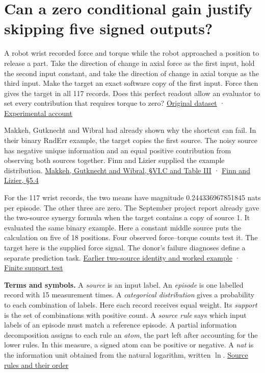 \section{Can a zero conditional gain justify skipping five signed outputs?}\label{can-a-zero-conditional-gain-justify-skipping-five-signed-outputs}

A robot wrist recorded force and torque while the robot approached a position to release a part. Take the direction of change in axial force as the first input, hold the second input constant, and take the direction of change in axial torque as the third input. Make the target an exact software copy of the first input. Force then gives the target in all 117 records. Does this perfect readout allow an evaluator to set every contribution that requires torque to zero? \href{https://doi.org/10.24432/C5M89N}{Original dataset} · \href{https://doi.org/10.1007/978-1-4615-5725-8_23}{Experimental account}

Makkeh, Gutknecht and Wibral had already shown why the shortcut can fail. In their binary RndErr example, the target copies the first source. The noisy source has negative unique information and an equal positive contribution from observing both sources together. Finn and Lizier supplied the example distribution. \href{https://arxiv.org/pdf/2002.03356v5\#page=11}{Makkeh, Gutknecht and Wibral, §VI.C and Table III} · \href{https://doi.org/10.3390/e20040297}{Finn and Lizier, §5.4}

For the 117 wrist records, the two means have magnitude 0.244336967851845 nats per episode. The other three are zero. The September project report already gave the two-source synergy formula when the target contains a copy of source 1. It evaluated the same binary example. Here a constant middle source puts the calculation on five of 18 positions. Four observed force--torque counts test it. The target here is the supplied force signal. The donor's failure diagnoses define a separate prediction task. \href{https://github.com/sepahead/pid-rs/blob/6a9f087be84bc21a89ff51e7da8e626e6883d73e/audit/evidence/finite-target-copy-mgw-synergy.md}{Earlier two-source identity and worked example} · \href{https://github.com/sepahead/pid-rs/blob/main/audit/research/categorical-third-source-budget-sharpness/independent/copy-target/COPY-TARGET.md}{Finite support test}

\textbf{Terms and symbols.} A \emph{source} is an input label. An \emph{episode} is one labelled record with 15 measurement times. A \emph{categorical distribution} gives a probability to each combination of labels. Here each record receives equal weight. Its \emph{support} is the set of combinations with positive count. A \emph{source rule} says which input labels of an episode must match a reference episode. A partial information decomposition assigns to each rule an \emph{atom}, the part left after accounting for the lower rules. In this measure, a signed atom can be positive or negative. A \emph{nat} is the information unit obtained from the natural logarithm, written \(\ln\). \href{https://doi.org/10.1098/rspa.2021.0110}{Source rules and their order}

